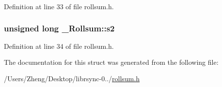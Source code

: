Definition at line 33 of file rollsum.\+h.

\hypertarget{struct___rollsum_ab7c79a9d1ecb7dc72efe45d58a181381}{}
\subsubsection[{s2}]{\setlength{\rightskip}{0pt plus 5cm}unsigned long \+\_\+\+Rollsum\+::s2}\label{struct___rollsum_ab7c79a9d1ecb7dc72efe45d58a181381}


Definition at line 34 of file rollsum.\+h.



The documentation for this struct was generated from the following file\+:\begin{DoxyCompactItemize}
\item 
/\+Users/\+Zheng/\+Desktop/librsync-\/0../\hyperlink{rollsum_8h}{rollsum.\+h}\end{DoxyCompactItemize}
